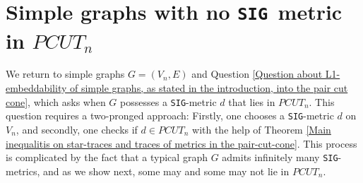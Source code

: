 \documentclass[12pt]{amsart}
\numberwithin{theorem}{section}
\theoremstyle{remark}
\newcommand{\sig}{{\tt SIG }}
\newcommand{\sigg}{{\tt SIG}}
\begin{document}
\section{Simple graphs with no \sig metric in $PCUT_n$} \label{Section with applications of main theorem to simple graphs}
We return to simple graphs $G=(V_n, E)$ and Question \ref{Question about L1-embeddability of simple graphs, as stated in the introduction, into the pair cut cone}, which asks when $G$ possesses a \sigg-metric $d$ that lies in $PCUT_n$. This question requires a two-pronged approach: Firstly, one chooses a \sigg-metric $d$ on $V_n$, and secondly, one checks if $d\in PCUT_n$  with the help of Theorem \ref{Main inequalitis on star-traces and traces of metrics in the pair-cut-cone}. This process is complicated by the fact that a typical graph $G$ admits infinitely many \sigg-metrics, and as we show next, some may and some may not lie in $PCUT_n$. 
\end{document}
